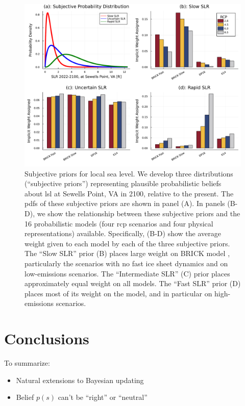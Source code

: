 \documentclass[12pt]{article}
\begin{document}
\begin{figure}
    \centering
    \includegraphics[width=\textwidth]{lsl-priors-weights}
    \caption{
        Subjective priors for local sea level.
        We develop three distributions (``subjective priors'') representing plausible probabilistic beliefs about \gls{lsl} at Sewells Point, VA in 2100, relative to the present.
        The \glspl{pdf} of these subjective priors are shown in panel (A).
        In panels (B-D), we show the relationship between these subjective priors and the 16 probabilistic models (four \gls{rcp} scenarios and four physical representations) available.
        Specifically, (B-D) show the average weight given to each model by each of the three subjective priors.
        The ``Slow SLR'' prior (B) places large weight on BRICK model \citep{wong_brick0.2:2017}, particularly the scenarios with no fast ice sheet dynamics and on low-emissions scenarios.
        The ``Intermediate SLR'' (C) prior places approximately equal weight on all models.
        The ``Fast SLR'' prior (D) places most of its weight on the \citet{deconto_antarctica:2016} model, and in particular on high-emissions scenarios.
    }\label{fig:lsl-priors-weights}
\end{figure}


\section{Conclusions}\label{sec:conclusions}

To summarize:
\begin{itemize}
    \item Natural extensions to Bayesian updating
    \item Belief $p(s)$ can't be ``right''  \citep{gelman_workflow:2020,gelman_philosophy:2013} or ``neutral'' \citep{quinn_exploratory:2020}
\end{itemize}
\end{document}
